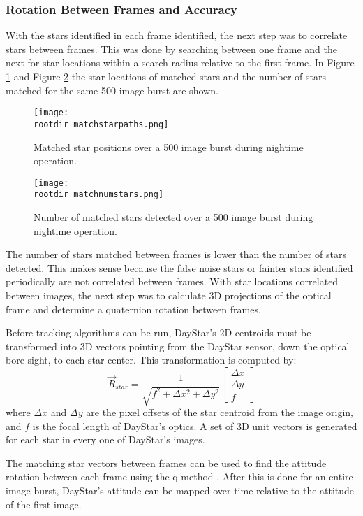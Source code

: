 \documentclass[twocolumn,letterpaper]{IEEEAerospace2012}
\newcommand{\brackets} [1] {\left[ #1 \right]}
\newcommand{\rootdir}{./Figures/}
\newcommand{\arrayb}[2]{\brackets{ \begin{array}{#1}  #2 \end{array} } }
\begin{document}
\subsubsection{Rotation Between Frames and Accuracy}

With the stars identified in each frame identified, the next step was to correlate stars between frames. This was done by searching between one frame and the next for star locations within a search radius relative to the first frame. In Figure \ref{fig:matchstarpaths} and Figure \ref{fig:matchnumstars} the star locations of matched stars and the number of stars matched for the same 500 image burst are shown.
\begin{figure}
    \centering
    \texttt{[image: \\rootdir matchstarpaths.png]}
    \caption{Matched star positions over a 500 image burst during nightime operation.}
    \label{fig:matchstarpaths}
\end{figure}
\begin{figure}
    \centering
    \texttt{[image: \\rootdir matchnumstars.png]}
    \caption{Number of matched stars detected over a 500 image burst during nightime operation.}
    \label{fig:matchnumstars}
\end{figure}

The number of stars matched between frames is lower than the number of stars detected. This makes sense because the false noise stars or fainter stars identified periodically are not correlated between frames. With star locations correlated between images, the next step was to calculate 3D projections of the optical frame and determine a quaternion rotation between frames.

Before tracking algorithms can be run, DayStar's 2D centroids must be transformed into 3D vectors pointing from the DayStar sensor, down the optical bore-sight, to each star center. This transformation is computed by:
\begin{equation}
    \vec{R}_{star} = \frac{1}{\sqrt{f^2 + \Delta{x^2} + \Delta{y^2}}} \arrayb{c}{\Delta{x} \\ \Delta{y} \\ f}
\end{equation}
where $\Delta{x}$ and $\Delta{y}$ are the pixel offsets of the star centroid from the image origin, and $f$ is the focal length of DayStar's optics. A set of 3D unit vectors is generated for each star in every one of DayStar's images.

The matching star vectors between frames can be used to find the attitude rotation between each frame using the q-method \cite{qmethod}. After this is done for an entire image burst, DayStar's attitude can be mapped over time relative to the attitude of the first image.
\end{document}
